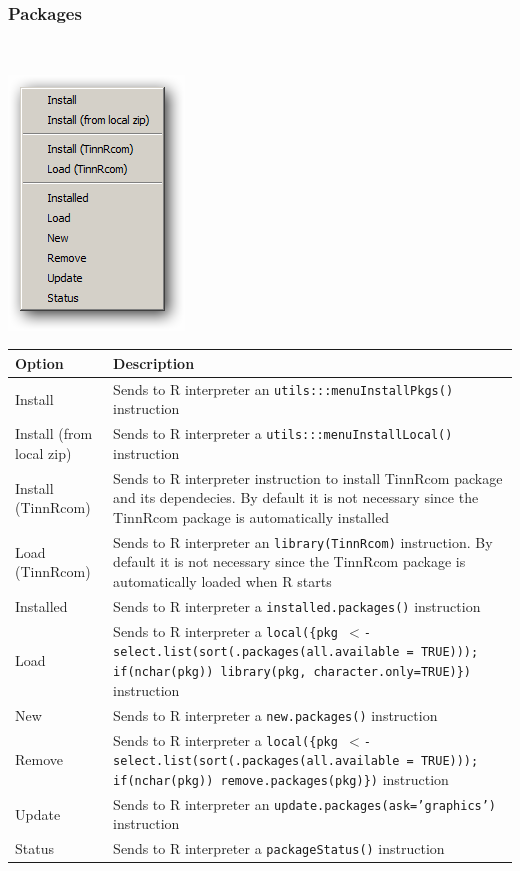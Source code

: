 \hypertarget{menu_r_control_packages}{}
\subsubsection{Packages}\\

\includegraphics[scale=0.50]{./res/menu_r_control_packages.png}\\

\begin{scriptsize}\begin{tabularx}{\headwidth}{>{\hsize=0.2\hsize}X>{\hsize=0.7\hsize}X}\\
    \hline
    \textbf{Option} & \textbf{Description} \\
    \hline
    Install & Sends to R interpreter an \texttt{utils:::menuInstallPkgs()} instruction \\
    Install (from local zip) & Sends to R interpreter a \texttt{utils:::menuInstallLocal()} instruction \\
    Install (TinnRcom) & Sends to R interpreter instruction to install TinnRcom package and its dependecies.
      By default it is not necessary since the TinnRcom package is automatically installed \\
    Load (TinnRcom) & Sends to R interpreter an \texttt{library(TinnRcom)} instruction.
      By default it is not necessary since the TinnRcom package is automatically loaded when R starts \\
    Installed & Sends to R interpreter a \texttt{installed.packages()} instruction \\
    Load & Sends to R interpreter a \texttt{local(\{pkg $<$- select.list(sort(.packages(all.available = TRUE))); if(nchar(pkg)) library(pkg, character.only=TRUE)\})} instruction \\
    New & Sends to R interpreter a \texttt{new.packages()} instruction \\
    Remove & Sends to R interpreter a \texttt{local(\{pkg $<$- select.list(sort(.packages(all.available = TRUE))); if(nchar(pkg)) remove.packages(pkg)\})} instruction \\
    Update & Sends to R interpreter an \texttt{update.packages(ask='graphics')} instruction \\
    Status & Sends to R interpreter a \texttt{packageStatus()} instruction \\
    \hline
  \end{tabularx}\end{scriptsize}
